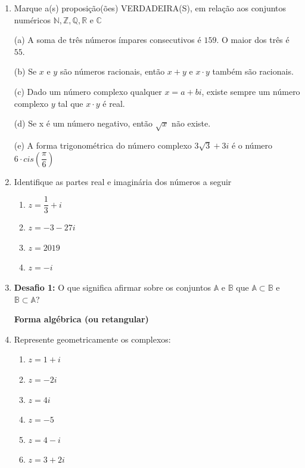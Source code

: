 \documentclass[a4paper, 11pt]{article}
\begin{document}
\begin{enumerate}
\item Marque a(s) proposição(ões) VERDADEIRA(S), em relação aos conjuntos numéricos $\mathbb{N}, \mathbb{Z}, \mathbb{Q}, \mathbb{R} \textrm{ e } \mathbb{C} $

(a) A soma de três números ímpares consecutivos é $159$. O maior dos três é $55$.

(b) Se $x$ e $y$ são números racionais, então $x+y$ e $x \cdot y$ também são racionais.

(c) Dado um número complexo qualquer $x = a+bi$, existe sempre um número complexo $y$ tal que $x \cdot y$ é real.

(d) Se x é um número negativo, então $\sqrt{x}$ não existe.

(e) A forma trigonométrica do número complexo $3\sqrt{3} + 3i$ é o número $6\cdot cis (\dfrac{\pi}{6})$ 

\item Identifique as partes real e imaginária dos números a seguir
	\begin{enumerate}
	\item $z = \dfrac{1}{3} + i$
	\item $z = -3 - 27i$
	\item $z = 2019$
	\item $z = -i$
	\end{enumerate}

\item \textbf{Desafio 1:} O que significa afirmar sobre os conjuntos $\mathbb{A}$ e $\mathbb{B}$ que $\mathbb{A} \subset \mathbb{B}$ e $\mathbb{B} \subset \mathbb{A}$?
\\


\begin{center}
	\textbf{Forma algébrica (ou retangular)}
	\\
\end{center}


\item Represente geometricamente os complexos:
	\begin{enumerate}
	\item $z = 1 + i$
	\item $z = -2i$
	\item $z = 4i$
	\item $z = -5$
	\item $z = 4 - i$
	\item $z = 3 + 2i$
	\end{enumerate}


\end{enumerate}
\end{document}
